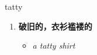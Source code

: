 
\begin{frame}
{\huge tatty}
\begin{center}
\begin{enumerate}\Large
  \item \textbf{破旧的，衣衫褴褛的}
  \begin{itemize}
    \item \em{\Large{a tatty shirt}}
  \end{itemize}
\end{enumerate}
\end{center}
\end{frame}
